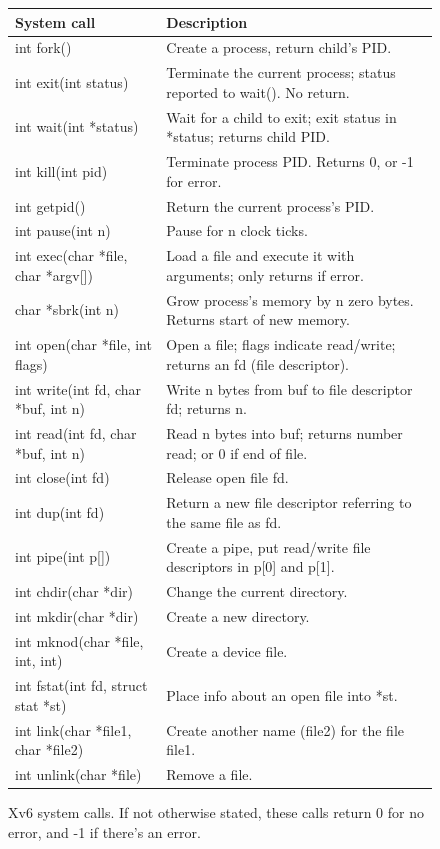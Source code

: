 \begin{figure}[t]
\center
\begin{tabular}{ll}
{\bf System call} & {\bf Description} \\
\midrule
int fork() & Create a process, return child's PID. \\
int exit(int status) & Terminate the current process; status reported to wait(). No return. \\
int wait(int *status) & Wait for a child to exit; exit status in *status; returns child PID. \\
int kill(int pid) & Terminate process PID. Returns 0, or -1 for error. \\
int getpid() & Return the current process's PID. \\
int pause(int n) & Pause for n clock ticks. \\
int exec(char *file, char *argv[]) & Load a file and execute it with arguments; only returns if error. \\
char *sbrk(int n) & Grow process's memory by n zero bytes. Returns start of new memory. \\
int open(char *file, int flags) & Open a file; flags indicate read/write; returns an fd (file descriptor). \\
int write(int fd, char *buf, int n) & Write n bytes from buf to file descriptor fd; returns n. \\
int read(int fd, char *buf, int n) & Read n bytes into buf; returns number read; or 0 if end of file. \\
int close(int fd) & Release open file fd. \\
int dup(int fd) & Return a new file descriptor referring to the same file as fd.\\
int pipe(int p[]) & Create a pipe, put read/write file descriptors in p[0] and p[1]. \\
int chdir(char *dir) & Change the current directory. \\
int mkdir(char *dir) & Create a new directory. \\
int mknod(char *file, int, int) & Create a device file. \\
int fstat(int fd, struct stat *st) & Place info about an open file into *st. \\
int link(char *file1, char *file2) & Create another name (file2) for the file file1. \\
int unlink(char *file) & Remove a file. \\
\end{tabular}
\caption{Xv6 system calls. If not otherwise stated, these calls return
0 for no error, and -1 if there's an error.}
\label{fig:api}
\end{figure}

